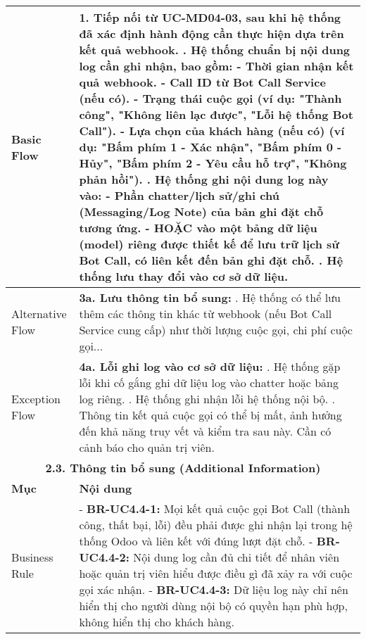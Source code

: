 \begin{longtable}{|m{4cm}|p{11cm}|}
Basic Flow & 1. Tiếp nối từ UC-MD04-03, sau khi hệ thống đã xác định hành động cần thực hiện dựa trên kết quả webhook. \newline 2. Hệ thống chuẩn bị nội dung log cần ghi nhận, bao gồm: \newline    - Thời gian nhận kết quả webhook. \newline    - Call ID từ Bot Call Service (nếu có). \newline    - Trạng thái cuộc gọi (ví dụ: "Thành công", "Không liên lạc được", "Lỗi hệ thống Bot Call"). \newline    - Lựa chọn của khách hàng (nếu có) (ví dụ: "Bấm phím 1 - Xác nhận", "Bấm phím 0 - Hủy", "Bấm phím 2 - Yêu cầu hỗ trợ", "Không phản hồi"). \newline 3. Hệ thống ghi nội dung log này vào: \newline    - Phần chatter/lịch sử/ghi chú (Messaging/Log Note) của bản ghi đặt chỗ tương ứng. \newline    - HOẶC vào một bảng dữ liệu (model) riêng được thiết kế để lưu trữ lịch sử Bot Call, có liên kết đến bản ghi đặt chỗ. \newline 4. Hệ thống lưu thay đổi vào cơ sở dữ liệu. \\
\hline
Alternative Flow & \textbf{3a. Lưu thông tin bổ sung:} \newline    1. Hệ thống có thể lưu thêm các thông tin khác từ webhook (nếu Bot Call Service cung cấp) như thời lượng cuộc gọi, chi phí cuộc gọi... \\
\hline
Exception Flow & \textbf{4a. Lỗi ghi log vào cơ sở dữ liệu:} \newline    1. Hệ thống gặp lỗi khi cố gắng ghi dữ liệu log vào chatter hoặc bảng log riêng. \newline    2. Hệ thống ghi nhận lỗi hệ thống nội bộ. \newline    3. Thông tin kết quả cuộc gọi có thể bị mất, ảnh hưởng đến khả năng truy vết và kiểm tra sau này. Cần có cảnh báo cho quản trị viên. \\
\hline
\multicolumn{2}{|c|}{\textbf{2.3. Thông tin bổ sung (Additional Information)}} \\
\hline
\textbf{Mục} & \textbf{Nội dung} \\
\hline
Business Rule & - \textbf{BR-UC4.4-1:} Mọi kết quả cuộc gọi Bot Call (thành công, thất bại, lỗi) đều phải được ghi nhận lại trong hệ thống Odoo và liên kết với đúng lượt đặt chỗ. \newline - \textbf{BR-UC4.4-2:} Nội dung log cần đủ chi tiết để nhân viên hoặc quản trị viên hiểu được điều gì đã xảy ra với cuộc gọi xác nhận. \newline - \textbf{BR-UC4.4-3:} Dữ liệu log này chỉ nên hiển thị cho người dùng nội bộ có quyền hạn phù hợp, không hiển thị cho khách hàng. \\

\end{longtable}
